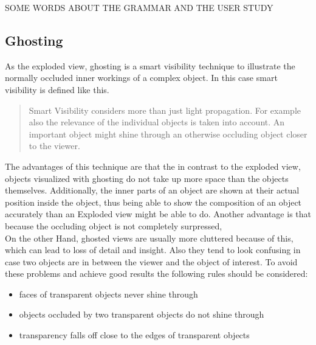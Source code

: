 SOME WORDS ABOUT THE GRAMMAR AND THE USER STUDY

\subsection{Ghosting}
As the exploded view, ghosting is a smart visibility technique to illustrate the normally occluded inner workings of a complex object. In this case smart visibility is defined like this.
\begin{quote}Smart Visibility considers more than just light propagation. For example also the relevance of the individual objects is taken into account. An important object might shine through an otherwise occluding object closer to the viewer. \cite{Viola-05-Smart}\end{quote}
The advantages of this technique are that the in contrast to the exploded view, objects visualized with ghosting do not take up more space than the objects themselves. Additionally, the inner parts of an object are shown at their actual position inside the object, thus being able to show the composition of an object accurately than an Exploded view might be able to do. Another advantage is that because the occluding object is not completely surpressed, \\
On the other Hand, ghosted views are usually more cluttered because of this, which can lead to loss of detail and insight. Also they tend to look confusing in case two objects are in between the viewer and the object of interest. To avoid these problems and achieve good results the following rules should be considered:\cite{Viola-05-Smart}
\begin{itemize}
\item faces of transparent objects never shine through
\item objects occluded by two transparent objects do not shine through
\item transparency falls off close to the edges of transparent objects
\end{itemize}
